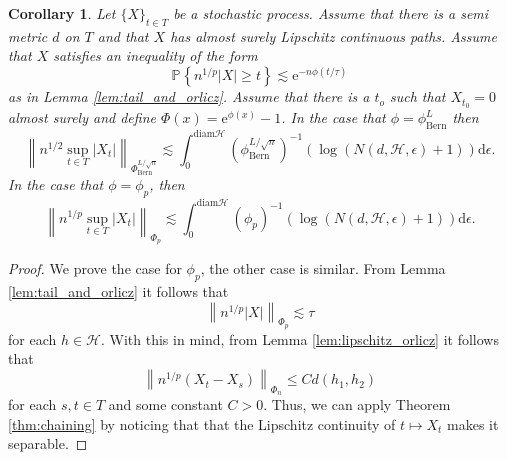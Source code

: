 \documentclass{uvamath}
\newcommand*{\calH}{\mathcal{H}}
\newcommand*{\prob}[2][]{\mathbb{P}_{#1}\left\{#2\right\}}
\newcommand*{\paren}[1]{\left(#1\right)}
\newcommand*{\norm}[1]{\left\lVert#1\right\rVert}
\newcommand*{\rme}{\mathrm{e}}
\newcommand*{\rmd}{\mathrm{d}}
\newtheorem{corollary}[theorem]{Corollary}
\theoremstyle{remark}
\theoremstyle{definition}
\theoremstyle{definition}
\theoremstyle{definition}
\theoremstyle{definition}
\theoremstyle{definition}
\begin{document}
\begin{appendices}
\begin{corollary}\label{thm:special_chaining}
  Let $\{X\}_{t\in T}$ be a stochastic process. Assume that there is a
  semi metric $d$ on $T$ and that $X$ has almost surely Lipschitz
  continuous paths. Assume that $X$ satisfies an inequality
  of the form
  \begin{equation}
    \prob{n^{1/p}|X| \geq  t } \lesssim \rme^{-n\phi(t/\tau)}
  \end{equation}
  as in Lemma \ref{lem:tail_and_orlicz}. Assume that there is a $t_o$
  such that $X_{t_0}=0$ almost surely and define
  $\Phi(x) = \rme^{\phi(x)} -1$. In the case that
  $\phi = \phi_{\text{Bern}}^{L}$ then
  \begin{equation*}
    \norm{n^{1/2}\sup_{t\in T}|X_t|}_{\Phi_{\text{Bern}}^{L/\sqrt{n}}}
    \lesssim
    \int_{0}^{\mathrm{diam} \calH} \paren{\phi_{\text{Bern}}^{L/\sqrt{n}}}^{-1}
    \paren{\log(N(d, \calH, \epsilon) + 1)} \rmd \epsilon.
  \end{equation*}
  In the case that $\phi=\phi_p$, then
  \begin{equation*}
    \norm{n^{1/p}\sup_{t\in T}|X_t|}_{\Phi_p}
    \lesssim
    \int_{0}^{\mathrm{diam} \calH} \paren{\phi_p}^{-1}
    \paren{\log(N(d, \calH, \epsilon) + 1)} \rmd \epsilon.
  \end{equation*}
\end{corollary}
\begin{proof}
  We prove the case for $\phi_p$, the other case is similar.  From
  Lemma \ref{lem:tail_and_orlicz} it follows that
  \begin{equation*}
    \norm{n^{1/p}|X|}_{\Phi_p}\lesssim\tau
  \end{equation*}
  for each $h\in\calH$. With this in mind, from Lemma
  \ref{lem:lipschitz_orlicz} it follows that
  \begin{equation*}
    \norm{n^{1/p}(X_t-X_s)}_{\Phi_n}\leq Cd(h_1,h_2)
  \end{equation*}
  for each $s,t\in T$ and some constant $C>0$. Thus, we can apply
  Theorem \ref{thm:chaining} by noticing that that the Lipschitz
  continuity of $t\mapsto X_t$ makes it separable.
\end{proof}


\end{appendices}
\end{document}
